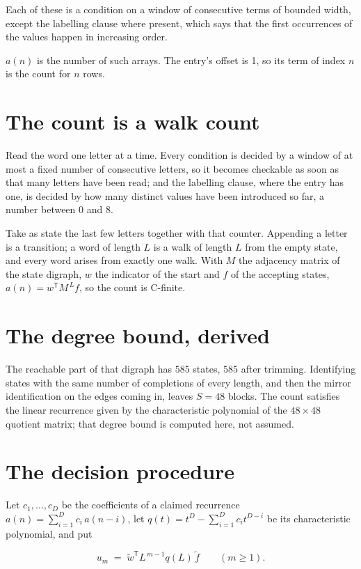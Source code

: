 \documentclass[11pt]{article}
\theoremstyle{definition}
\begin{document}
Each of these is a condition on a window of consecutive terms of bounded width, except the labelling clause where present, which says that the first occurrences of the values happen in increasing order.

$a(n)$ is the number of such arrays. The entry's offset is 1, so its term of index $n$ is the count for $n$ rows.

\section{The count is a walk count}

Read the word one letter at a time. Every condition is decided by a window of at most a fixed number of consecutive letters, so it becomes checkable as soon as that many letters have been read; and the labelling clause, where the entry has one, is decided by how many distinct values have been introduced so far, a number between $0$ and 8.

Take as state the last few letters together with that counter. Appending a letter is a transition; a word of length $L$ is a walk of length $L$ from the empty state, and every word arises from exactly one walk. With $M$ the adjacency matrix of the state digraph, $w$ the indicator of the start and $f$ of the accepting states, $a(n) = w^{\mathsf T}M^{\,L}f$, so the count is C-finite.

\section{The degree bound, derived}

The reachable part of that digraph has $585$ states, $585$ after trimming. Identifying states with the same number of completions of every length, and then the mirror identification on the edges coming in, leaves $S = 48$ blocks. The count satisfies the linear recurrence given by the characteristic polynomial of the $48\times48$ quotient matrix; that degree bound is computed here, not assumed.

\section{The decision procedure}

Let $c_1,\dots,c_D$ be the coefficients of a claimed recurrence $a(n) = \sum_{i=1}^{D} c_i\,a(n-i)$, let $q(t) = t^{D} - \sum_{i=1}^{D} c_i t^{D-i}$ be its characteristic polynomial, and put

\[u_m \;=\; \tilde w^{\mathsf T} L^{\,m-1} q(L)\,\tilde f \qquad (m \ge 1).\]
\end{document}
